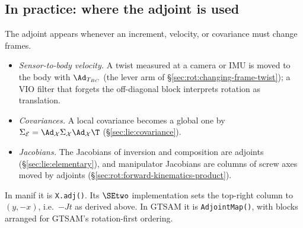 \subsection{In practice: where the adjoint is used}\label{sec:lie:adjoint-in-practice}

The adjoint appears whenever an increment, velocity, or covariance must change frames.
\begin{itemize}
\item \emph{Sensor-to-body velocity.} A twist measured at a camera or IMU is moved to the body with $\Ad_{T_{BC}}$ (the lever arm of \S\ref{sec:rot:changing-frame-twist}); a VIO filter that forgets the off-diagonal block interprets rotation as translation.
\item \emph{Covariances.} A local covariance becomes a global one by $\Sigma_{\mathcal E}=\Ad_{\mathcal X}\Sigma_{\mathcal X}\Ad_{\mathcal X}\T$ (\S\ref{sec:lie:covariance}).
\item \emph{Jacobians.} The Jacobians of inversion and composition are adjoints (\S\ref{sec:lie:elementary}), and manipulator Jacobians are columns of screw axes moved by adjoints (\S\ref{sec:rot:forward-kinematics-product}).
\end{itemize}
In manif it is \texttt{X.adj()}. Its $\SEtwo$ implementation sets the top-right column to $(y,-x)$, i.e.\ $-Jt$ as derived above. In GTSAM it is \texttt{AdjointMap()}, with blocks arranged for GTSAM's rotation-first ordering.
